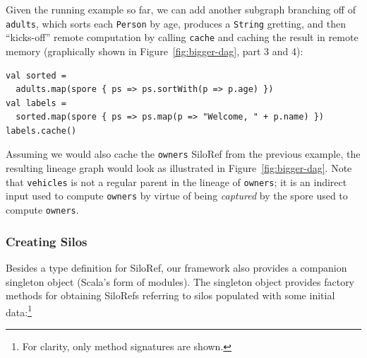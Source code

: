 \documentclass{jfp1}
\begin{document}
Given the running example so far, we can add another subgraph branching off of
\verb|adults|, which sorts each \verb|Person| by age, produces a \verb|String|
gretting, and then ``kicks-off'' remote computation by calling \verb|cache| and
caching the result in remote memory (graphically shown in
Figure~\ref{fig:bigger-dag}, part 3 and 4):

\begin{lstlisting}
val sorted =
  adults.map(spore { ps => ps.sortWith(p => p.age) })
val labels =
  sorted.map(spore { ps => ps.map(p => "Welcome, " + p.name) })
labels.cache()
\end{lstlisting}
\noindent
Assuming we would also cache the \verb|owners| SiloRef from the previous
example, the resulting lineage graph would look as illustrated in
Figure~\ref{fig:bigger-dag}. Note that \verb|vehicles|
is not a regular parent in the lineage of \verb|owners|; it is an indirect
input used to compute \verb|owners| by virtue of being {\em captured} by the
spore used to compute \verb|owners|.



%

\subsubsection{Creating Silos}
\label{sec:creating-silos}

Besides a type definition for SiloRef, our framework also provides a companion
singleton object (Scala's form of modules). The singleton object provides
factory methods for obtaining SiloRefs referring to silos populated with some
initial data:\footnote{For clarity, only method signatures are shown.}
\end{document}
